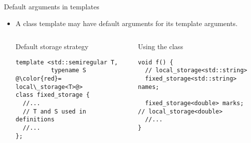 \begin{frame}[t,fragile]{Default arguments in templates}
\begin{itemize}
  \item A class template may have default arguments for its template arguments.

\begin{columns}[T]

\begin{block}{Default storage strategy}
\begin{lstlisting}[escapechar=@]
template <std::semiregular T, 
          typename S @\color{red}= local\_storage<T>@>
class fixed_storage {
  //...
  // T and S used in definitions
  //...
};
\end{lstlisting}
\end{block}

\pause
{}
\begin{block}{Using the class}
\begin{lstlisting}
void f() {
  // local_storage<std::string>
  fixed_storage<std::string> names;

  fixed_storage<double> marks; // local_storage<double>
  //...
}
\end{lstlisting}
\end{block}

\end{columns}

\end{itemize}
\end{frame}

